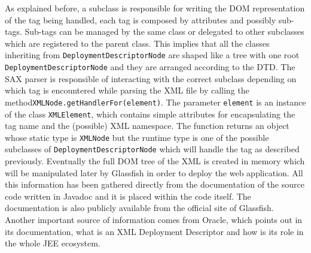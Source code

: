 As explained before, a subclass is responsible for writing the DOM representation of the tag being handled, each tag is composed by attributes and possibly sub-tags. Sub-tags can be managed by the same class or delegated to other subclasses which are registered to the parent class. \newline This implies that all the classes inheriting from \texttt{DeploymentDescriptorNode} are shaped like a tree with one root \texttt{DeploymentDescriptorNode} and they are arranged according to the DTD. \newline The SAX parser is responsible of interacting with the correct subclass depending on which tag is encountered while parsing the XML file by calling the method\newline\texttt{XMLNode.getHandlerFor(element)}. The parameter \texttt{element} is an instance of the class \texttt{XMLElement}, which contains simple attributes for encapsulating the tag name and the (possible) XML namespace. The function returns an object whose static type is \texttt{XMLNode} but the runtime type is one of the possible subclasses of \newline \texttt{DeploymentDescriptorNode} which will handle the tag as described previously. \newline
Eventually the full DOM tree of the XML is created in memory which will be manipulated later by Glassfish in order to deploy the web application. \newline
All this information has been gathered directly from the documentation of the source code written in Javadoc and it is placed within the code itself. The documentation is also publicly available from the official site of Glassfish. Another important source of information comes from Oracle, which points out in its documentation, what is an XML Deployment Descriptor and how is its role in the whole JEE ecosystem.